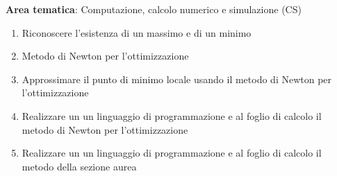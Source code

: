 \noindent\textbf{Area tematica}: Computazione, calcolo numerico e simulazione (CS)

    
\begin{enumerate}
  \item Riconoscere l'esistenza di un massimo e di un minimo
  \item Metodo di Newton per l'ottimizzazione
  \item Approssimare il punto di minimo locale usando il metodo di Newton per l'ottimizzazione
  \item Realizzare un un linguaggio di programmazione e al foglio di calcolo il metodo di Newton per l'ottimizzazione
  \item Realizzare un un linguaggio di programmazione e al foglio di calcolo il metodo della sezione aurea
\end{enumerate}

